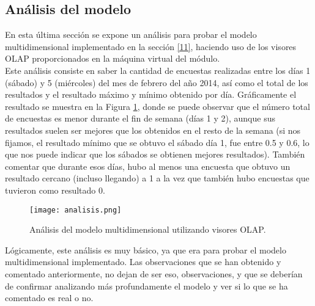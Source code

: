 \medskip
\subsection{Análisis del modelo}
En esta última sección se expone un análisis para probar el modelo multidimensional implementado en la sección \ref{11}, haciendo uso de los visores OLAP proporcionados en la máquina virtual del módulo. \\

Este análisis consiste en saber la cantidad de encuestas realizadas entre los días 1 (sábado) y 5 (miércoles) del mes de febrero del año 2014, así como el total de los resultados y el resultado máximo y mínimo obtenido por día. Gráficamente el resultado se muestra en la Figura \ref{analisis}, donde se puede observar que el número total de encuestas es menor durante el fin de semana (días 1 y 2), aunque sus resultados suelen ser mejores que los obtenidos en el resto de la semana (si nos fijamos, el resultado mínimo que se obtuvo el sábado día 1, fue entre 0.5 y 0.6, lo que nos puede indicar que los sábados se obtienen mejores resultados). También comentar que durante esos días, hubo al menos una encuesta que obtuvo un resultado cercano (incluso llegando) a 1 a la vez que también hubo encuestas que tuvieron como resultado 0.

\begin{figure}[!th]
\texttt{[image: analisis.png]}
\centering
\caption{Análisis del modelo multidimensional utilizando visores OLAP.}
\label{analisis}
\end{figure}

Lógicamente, este análisis es muy básico, ya que era para probar el modelo multidimensional implementado. Las observaciones que se han obtenido y comentado anteriormente, no dejan de ser eso, observaciones, y que se deberían de confirmar analizando más profundamente el modelo y ver si lo que se ha comentado es real o no.
